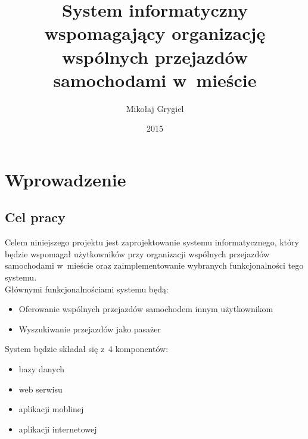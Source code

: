 \documentclass[eng,archivemode]{mgr}
\date{2015}
\title{System informatyczny wspomagający organizację wspólnych przejazdów samochodami w~mieście}
\author{Mikołaj Grygiel}
\begin{document}


\maketitle

\tableofcontents

\chapter{Wprowadzenie}
\section{Cel pracy}
\label{sec:cel}
Celem niniejszego projektu jest zaprojektowanie systemu informatycznego, który będzie wspomagał użytkowników przy organizacji wspólnych przejazdów samochodami w~mieście oraz zaimplementowanie wybranych funkcjonalności tego systemu.\\

Głównymi funkcjonalnościami systemu będą:
\begin{itemize}
	\item Oferowanie wspólnych przejazdów samochodem innym użytkownikom
	\item Wyszukiwanie przejazdów jako pasażer	
\end{itemize}

System będzie składał się z~4 komponentów:
\begin{itemize}
	\item bazy danych
	\item web serwisu
	\item aplikacji moblinej
	\item aplikacji internetowej	
\end{itemize}
\end{document}
